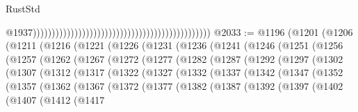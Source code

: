 \begin{lexlean}{RustStd}
\begin{coremodule}
                                                                                                  @1937)))))))))))))))))))))))))))))))))))))))))))))))
@2033 := @1196
    (@1201
      (@1206
        (@1211
          (@1216
            (@1221
              (@1226
                (@1231
                  (@1236
                    (@1241
                      (@1246
                        (@1251
                          (@1256
                            (@1257
                              (@1262
                                (@1267
                                  (@1272
                                    (@1277
                                      (@1282
                                        (@1287
                                          (@1292
                                            (@1297
                                              (@1302
                                                (@1307
                                                  (@1312
                                                    (@1317
                                                      (@1322
                                                        (@1327
                                                          (@1332
                                                            (@1337
                                                              (@1342
                                                                (@1347
                                                                  (@1352
                                                                    (@1357
                                                                      (@1362
                                                                        (@1367
                                                                          (@1372
                                                                            (@1377
                                                                              (@1382
                                                                                (@1387
                                                                                  (@1392
                                                                                    (@1397
                                                                                      (@1402
                                                                                        (@1407
                                                                                          (@1412
                                                                                            (@1417

\end{coremodule}
\end{lexlean}
